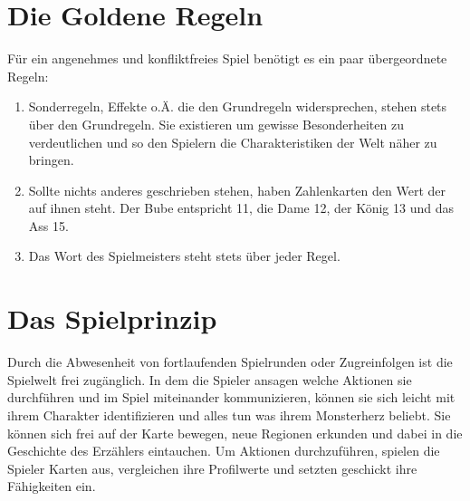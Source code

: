 \section{Die Goldene Regeln}
    Für ein angenehmes und konfliktfreies Spiel benötigt es ein paar übergeordnete Regeln:
    \begin{enumerate}
         \item Sonderregeln, Effekte o.Ä. die den Grundregeln widersprechen, stehen stets über den Grundregeln. Sie existieren um gewisse Besonderheiten zu verdeutlichen und so den Spielern die Charakteristiken der Welt näher zu bringen.
         \item Sollte nichts anderes geschrieben stehen, haben Zahlenkarten den Wert der auf ihnen steht. Der Bube entspricht 11, die Dame 12, der König 13 und das Ass 15.
         \item Das Wort des Spielmeisters steht stets über jeder Regel.
    \end{enumerate}

    
\section{Das Spielprinzip}
    Durch die Abwesenheit von fortlaufenden Spielrunden oder Zugreinfolgen ist die Spielwelt frei zugänglich. In dem die Spieler ansagen welche Aktionen sie durchführen und im Spiel miteinander kommunizieren, können sie sich leicht mit ihrem Charakter identifizieren und alles tun was ihrem Monsterherz beliebt. Sie können sich frei auf der Karte bewegen, neue Regionen erkunden und dabei in die Geschichte des Erzählers eintauchen. Um Aktionen durchzuführen, spielen die Spieler Karten aus, vergleichen ihre Profilwerte und setzten geschickt ihre Fähigkeiten ein.
    

